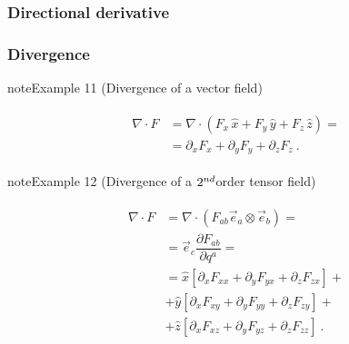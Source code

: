 \documentclass[letterpaper,10pt,english]{jupyterBook}
\begin{document}
\subsubsection{Directional derivative}
\label{\detokenize{ch/tensor-algebra-calculus/calculus-euclidean-cartesian:directional-derivative}}

\subsubsection{Divergence}
\label{\detokenize{ch/tensor-algebra-calculus/calculus-euclidean-cartesian:divergence}}\label{\detokenize{ch/tensor-algebra-calculus/calculus-euclidean-cartesian:tensor-calculus-cartesian-differential-operators-divergence}}\label{ch/tensor-algebra-calculus/calculus-euclidean-cartesian:example-3}
\begin{sphinxadmonition}{note}{Example 11 (Divergence of a vector field)}


\begin{equation*}
\begin{split}\begin{aligned}
 \nabla \cdot F 
  & = \nabla \cdot \left( F_x \, \hat{x} + F_y \, \hat{y} + F_z \, \hat{z} \right) = \\
  & = \partial_x F_x + \partial_y F_y + \partial_z F_z \ .
\end{aligned}\end{split}
\end{equation*}\end{sphinxadmonition}
\label{ch/tensor-algebra-calculus/calculus-euclidean-cartesian:example-4}
\begin{sphinxadmonition}{note}{Example 12 (Divergence of a \protect\(2^{nd}\protect\)\sphinxhyphen{}order tensor field)}


\begin{equation*}
\begin{split}\begin{aligned}
 \nabla \cdot F 
  & = \nabla \cdot \left( F_{ab} \vec{e}_a \otimes \vec{e}_b \right) = \\
  & = \vec{e}_c \dfrac{\partial F_{ab}}{\partial q^a} = \\
  & = \hat{x} \left[ \partial_x F_{xx} + \partial_y F_{yx} + \partial_z F_{zx} \right] + \\ 
  & + \hat{y} \left[ \partial_x F_{xy} + \partial_y F_{yy} + \partial_z F_{zy} \right] + \\ 
  & + \hat{z} \left[ \partial_x F_{xz} + \partial_y F_{yz} + \partial_z F_{zz} \right] \ .
\end{aligned}\end{split}
\end{equation*}\end{sphinxadmonition}
\end{document}
